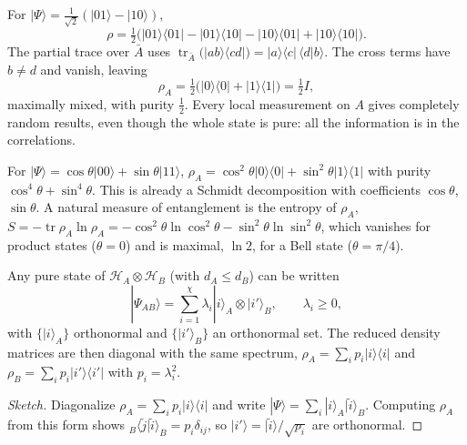 \begin{example}
For $|\Psi\rangle = \frac{1}{\sqrt2}(|01\rangle - |10\rangle)$,
\[
    \rho = \tfrac12\bigl(|01\rangle\langle01| - |01\rangle\langle10| - |10\rangle\langle01| + |10\rangle\langle10|\bigr).
\]
The partial trace over $\bar{A}$ uses $\operatorname{tr}_{\bar{A}}\bigl(|ab\rangle\langle cd|\bigr) = |a\rangle\langle c|\,\langle d|b\rangle$. The cross terms have $b\neq d$ and vanish, leaving
\[
    \rho_A = \tfrac12\bigl(|0\rangle\langle0| + |1\rangle\langle1|\bigr) = \tfrac12I,
\]
maximally mixed, with purity $\frac12$. Every local measurement on $A$ gives completely random results, even though the whole state is pure: all the information is in the correlations.
\end{example}

\begin{example}
For $|\Psi\rangle = \cos\theta|00\rangle + \sin\theta|11\rangle$, $\rho_A = \cos^2\theta|0\rangle\langle0| + \sin^2\theta|1\rangle\langle1|$ with purity $\cos^4\theta + \sin^4\theta$. This is already a Schmidt decomposition with coefficients $\cos\theta$, $\sin\theta$. A natural measure of entanglement is the entropy of $\rho_A$, $S = -\operatorname{tr}\rho_A\ln\rho_A = -\cos^2\theta\ln\cos^2\theta - \sin^2\theta\ln\sin^2\theta$, which vanishes for product states ($\theta = 0$) and is maximal, $\ln2$, for a Bell state ($\theta = \pi/4$).
\end{example}

\begin{theorem}
Any pure state of $\mathcal{H}_A\otimes\mathcal{H}_B$ (with $d_A\le d_B$) can be written
\[
    |\Psi_{AB}\rangle = \sum_{i=1}^{\chi}\lambda_i|i\rangle_A\otimes|i'\rangle_B,
    \qquad
    \lambda_i\ge0,
\]
with $\{|i\rangle_A\}$ orthonormal and $\{|i'\rangle_B\}$ an orthonormal set. The reduced density matrices are then diagonal with the same spectrum, $\rho_A = \sum_ip_i|i\rangle\langle i|$ and $\rho_B = \sum_ip_i|i'\rangle\langle i'|$ with $p_i = \lambda_i^2$.
\end{theorem}
\begin{proof}[Sketch]
Diagonalize $\rho_A = \sum_ip_i|i\rangle\langle i|$ and write $|\Psi\rangle = \sum_i|i\rangle_A|\tilde{i}\rangle_B$. Computing $\rho_A$ from this form shows ${}_B\langle\tilde{j}|\tilde{i}\rangle_B = p_i\delta_{ij}$, so $|i'\rangle = |\tilde{i}\rangle/\sqrt{p_i}$ are orthonormal.
\end{proof}

